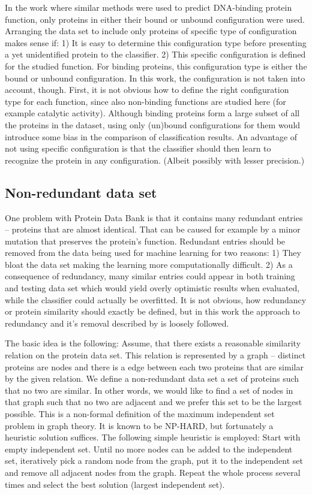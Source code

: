 \documentclass[11pt,twoside,a4paper]{book}
\begin{document}
In the work \cite{szabova} where similar methods were used to predict DNA-binding protein 
function, only proteins in either their bound or unbound configuration were used.
Arranging the data set to include only proteins of specific type of
configuration makes sense if: 1) It is easy to determine this configuration type 
before presenting a yet unidentified protein to the classifier. 
2) This specific configuration is defined for the studied function.
For binding proteins, this configuration type is either the bound
or unbound configuration.
In this work, the configuration is not taken into account, though.
First, it is not obvious how to define the right configuration
type for each function, since also non-binding functions
are studied here (for example catalytic activity).
Although binding proteins form a large subset of all the proteins
in the dataset, using only (un)bound configurations  for them  would introduce
some bias in the comparison of classification results.
An advantage of not using specific configuration is that 
the classifier should then learn to recognize 
the protein in any configuration.
(Albeit possibly with lesser precision.) 

\subsection{Non-redundant data set}
One problem with Protein Data Bank is that it contains many redundant entries --
proteins that are almost identical.
That can be caused for example by a minor mutation that preserves the protein's function.
Redundant entries should be removed from the data being used for machine learning for two reasons:
1) They bloat the data set making the learning more computationally difficult.
2) As a consequence of redundancy, many similar entries could appear in both training and testing data set
which would yield overly optimistic results when evaluated, 
while the classifier could actually be overfitted.
It is not obvious, how redundancy or protein similarity should exactly be defined,
but in this work the approach to redundancy and it's removal described by \cite{maxind} is loosely followed.

The basic idea is the following: 
Assume, that there exists a reasonable similarity relation on the protein data set. 
This relation is represented by a graph -- distinct proteins are nodes and there
is a edge between each two proteins that are similar by the given relation.
We define a non-redundant data set a set of proteins such that no two are similar.
In other words, we would like to find a set of nodes in that graph such that no two are adjacent
and we prefer this set to be the largest possible.
This is a non-formal definition of the maximum independent set problem in graph theory.
It is known to be NP-HARD, but fortunately a heuristic solution suffices.
The following simple heuristic is employed:
Start with empty independent set.
Until no more nodes can be added to the independent set,
iteratively pick a random node from the graph,
put it to the independent set and remove all adjacent nodes from the graph.
Repeat the whole process several times and select the best solution (largest independent set).
\end{document}
